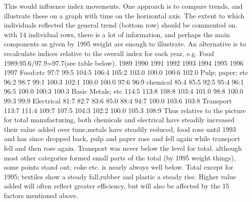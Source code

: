 
\newpage

This
would influence index movements.
One approach is to compare trends, and illustrate these on a graph with time on the
horizontal axis. The extent to which individuals reflected the general trend (bottom
row) should be commented on. with 14 individual rows, there is a lot of information,
and perhaps the main components as given by 1995 weight are enough to illustrate.
An alternative is to recalculate indices relative to the overall index for each year, e.g.
Food 1989:95.6/97.9=97.7(see table below).
1989 1990 1991 1992 1993 1994 1995 1996 1997
Food:etc 97:7 99:5 104:5 106:4 105:2 103.0 100.0 100:6 102.0
Pulp; paper; etc 96:2 98:7 99:1 100:3 102:1 100.0 100.0 97:6 96:9
chemical 85:4 85:5 92:5 95:4 96:1 96:5 100.0 100:3 100:3
Basic Metals; etc 114:5 113:8 108:8 103:4 101.0 98:8 100.0 99:3 99:9
Electrical 81:7 82:7 83:6 85.0 88:4 94:7 100.0 103:6 103:8
Transport 113:7 111:4 109:7 107:5 104:3 102:2 100.0 105:3 108:9
Thus relative to the picture for total manufacturing, both chemicals and electrical have
steadily increased their value added over time,metals have steadily reduced, food rose
until 1993 and has since dropped back, pulp and paper rose and fell again while transport
fell and then rose again.
Transport was never below the level for total.
although most other categories formed small parts of the total (by 1995 weight things),
some points stand out; coke etc. is nearly always well below. Total except for 1995;
textiles show a steady fall,rubber and plastic a steady rise.
Higher value added will often reflect greater efficiency, but will also be affected by the
15
factors mentioned above.
